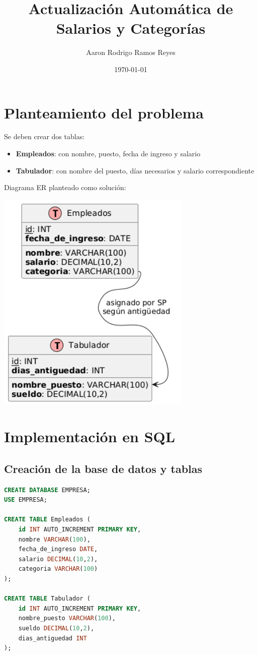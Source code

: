 \documentclass[12pt]{article}
\title{Actualización Automática de Salarios y Categorías}
\author{Aaron Rodrigo Ramos Reyes}
\date{\today}
\begin{document}
\maketitle

\section*{Planteamiento del problema}
Se deben crear dos tablas:
\begin{itemize}[leftmargin=*]
    \item \textbf{Empleados}: con nombre, puesto, fecha de ingreso y salario
    \item \textbf{Tabulador}: con nombre del puesto, días necesarios y salario correspondiente
\end{itemize}

Diagrama ER planteado como solución:
\begin{center}
    \includegraphics[width=0.7\textwidth]{DiagramaER.png}
\end{center}

\section*{Implementación en SQL}
\subsection*{Creación de la base de datos y tablas}
\begin{lstlisting}[language=SQL]
CREATE DATABASE EMPRESA;
USE EMPRESA;

CREATE TABLE Empleados (
    id INT AUTO_INCREMENT PRIMARY KEY,
    nombre VARCHAR(100),
    fecha_de_ingreso DATE,
    salario DECIMAL(10,2),
    categoria VARCHAR(100)
);

CREATE TABLE Tabulador (
    id INT AUTO_INCREMENT PRIMARY KEY,
    nombre_puesto VARCHAR(100),
    sueldo DECIMAL(10,2),
    dias_antiguedad INT
);
\end{lstlisting}
\end{document}
